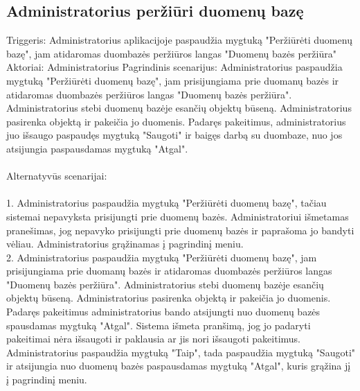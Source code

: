 \documentclass[oneside]{VUMIFPSkursinis}
\begin{document}
\subsection{Administratorius peržiūri duomenų bazę}
	Triggeris: Administratorius aplikacijoje paspaudžia mygtuką "Peržiūrėti duomenų bazę", jam atidaromas duombazės peržiūros langas "Duomenų bazės peržiūra"
	Aktoriai: Administratorius
	Pagrindinis scenarijus: Administratorius paspaudžia mygtuką "Peržiūrėti duomenų bazę", jam prisijungiama prie duomanų bazės ir atidaromas duombazės peržiūros langas "Duomenų bazės peržiūra". Administratorius stebi duomenų bazėje esančių objektų būseną. Administratorius pasirenka objektą ir pakeičia jo duomenis. Padaręs pakeitimus, administratorius juo išsaugo paspaudęs mygtuką "Saugoti" ir baigęs darbą su duombaze, nuo jos atsijungia paspausdamas mygtuką "Atgal". \\ \\
	Alternatyvūs scenarijai:  \\ \\ 
1. Administratorius paspaudžia mygtuką "Peržiūrėti duomenų bazę", tačiau sistemai nepavyksta prisijungti prie duomenų bazės. Administratoriui išmetamas pranešimas, jog nepavyko prisijungti prie duomenų bazės ir paprašoma jo bandyti vėliau. Administratorius grąžinamas į pagrindinį meniu. \\
2. Administratorius paspaudžia mygtuką "Peržiūrėti duomenų bazę", jam prisijungiama prie duomanų bazės ir atidaromas duombazės peržiūros langas "Duomenų bazės peržiūra". Administratorius stebi duomenų bazėje esančių objektų būseną. Administratorius pasirenka objektą ir pakeičia jo duomenis. Padaręs pakeitimus administratorius bando atsijungti nuo duomenų bazės spausdamas mygtuką "Atgal". Sistema išmeta pranšimą, jog jo padaryti pakeitimai nėra išsaugoti ir paklausia ar jis nori išsaugoti pakeitimus. Administratorius paspaudžia mygtuką "Taip", tada paspaudžia mygtuką "Saugoti" ir atsijungia nuo duomenų bazės paspausdamas mygtuką "Atgal", kuris grąžina jį į pagrindinį meniu. \\ \\
\end{document}
